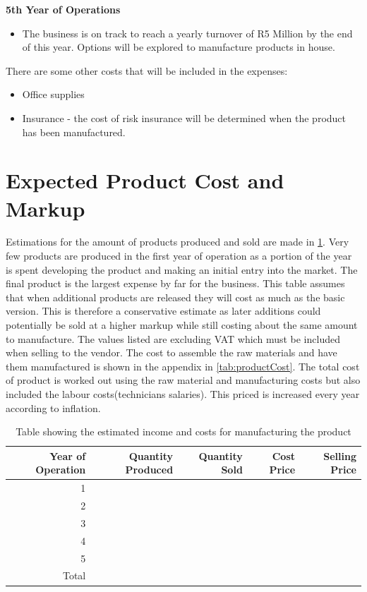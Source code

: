 {\bfseries 5th Year of Operations}
\begin{itemize}
\item The business is on track to reach a yearly turnover of R5 Million by the end of this year. Options will be explored to manufacture products in house.
\end{itemize}

There are some other costs that will be included in the expenses:
\begin{itemize}
\item Office supplies
\item Insurance - the cost of risk insurance will be determined when the product has been manufactured.
\end{itemize}

\section{Expected Product Cost and Markup}   

Estimations for the amount of products produced and sold are made in \cref{tab:tblProductSales}. Very few products are produced in the first year of operation as a portion of the year is spent developing the product and making an initial entry into the market. The final product is the largest expense by far for the business. This table assumes that when additional products are released they will cost as much as the basic version. This is therefore a conservative estimate as later additions could potentially be sold at a higher markup while still costing about the same amount to manufacture. The values listed are excluding VAT which must be included when selling to the vendor. The cost to assemble the raw materials and have them manufactured is shown in the appendix in \cref{tab:productCost}. The total cost of product is worked out using the raw material and manufacturing costs but also included the labour costs(technicians salaries). This priced is increased every year according to inflation. 

\begin{table}[htbp]
  \centering
  \caption{Table showing the estimated income and costs for manufacturing the product}
    \begin{tabular}{rrrrr}
    \toprule
    Year of Operation & Quantity Produced& Quantity Sold& Cost Price & Selling Price \\
    \midrule
    1     &       &       &  	&\\
    2     &       &       &  	&\\
    3     &       &       &  	&\\
    4     &       &       &  	&\\
    5     &       &       &  	&\\
    Total     &       &       &  	&\\
    \bottomrule
    \end{tabular}%
  \label{tab:tblProductSales}%
\end{table}%


